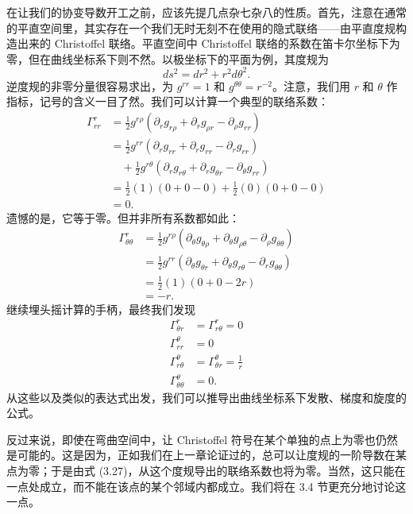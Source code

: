 在让我们的协变导数开工之前，应该先提几点杂七杂八的性质。首先，注意在通常的平直空间里，其实存在一个我们无时无刻不在使用的隐式联络——由平直度规构造出来的 Christoffel 联络。平直空间中 Christoffel 联络的系数在笛卡尔坐标下为零，但在曲线坐标系下则不然。以极坐标下的平面为例，其度规为
\begin{equation*}
ds^2 = dr^2 + r^2d\theta^2.
\tag{3.28}
\end{equation*}
逆度规的非零分量很容易求出，为 $g^{rr} = 1$ 和 $g^{\theta\theta} = r^{-2}$。注意，我们用 $r$ 和 $\theta$ 作指标，记号的含义一目了然。我们可以计算一个典型的联络系数：
\begin{align*}
\Gamma^r_{rr} &= \frac{1}{2}g^{r\rho}(\partial_r g_{r\rho} + \partial_r g_{\rho r} - \partial_\rho g_{rr})\\
&= \frac{1}{2}g^{rr}(\partial_r g_{rr} + \partial_r g_{rr} - \partial_r g_{rr})\\
&\quad + \frac{1}{2}g^{r\theta}(\partial_r g_{r\theta} + \partial_r g_{\theta r} - \partial_\theta g_{rr})\\
&= \frac{1}{2}(1)(0 + 0 - 0) + \frac{1}{2}(0)(0 + 0 - 0)\\
&= 0.
\tag{3.29}
\end{align*}
遗憾的是，它等于零。但并非所有系数都如此：
\begin{align*}
\Gamma^r_{\theta\theta} &= \frac{1}{2}g^{r\rho}(\partial_\theta g_{\theta\rho} + \partial_\theta g_{\rho\theta} - \partial_\rho g_{\theta\theta})\\
&= \frac{1}{2}g^{rr}(\partial_\theta g_{\theta r} + \partial_\theta g_{r\theta} - \partial_r g_{\theta\theta})\\
&= \frac{1}{2}(1)(0 + 0 - 2r)\\
&= -r.
\tag{3.30}
\end{align*}
继续埋头摇计算的手柄，最终我们发现
\begin{align*}
\Gamma^r_{\theta r} &= \Gamma^r_{r\theta} = 0\\
\Gamma^\theta_{rr} &= 0\\
\Gamma^\theta_{r\theta} &= \Gamma^\theta_{\theta r} = \frac{1}{r}\\
\Gamma^\theta_{\theta\theta} &= 0.
\tag{3.31}
\end{align*}
从这些以及类似的表达式出发，我们可以推导出曲线坐标系下发散、梯度和旋度的公式。

反过来说，即使在弯曲空间中，让 Christoffel 符号在某个单独的点上为零也仍然是可能的。这是因为，正如我们在上一章论证过的，总可以让度规的一阶导数在某点为零；于是由式 (3.27)，从这个度规导出的联络系数也将为零。当然，这只能在一点处成立，而不能在该点的某个邻域内都成立。我们将在 3.4 节更充分地讨论这一点。

